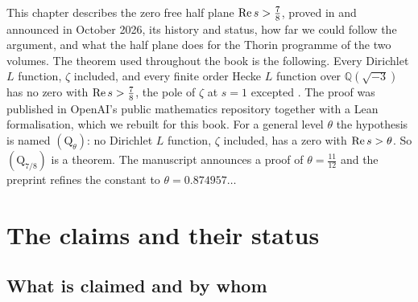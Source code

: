 
This chapter describes the zero free half plane $\operatorname{Re} s>\frac78$, proved in \cite{OAI26a} and announced in October 2026, its history and status, how far we could follow the argument, and what the half plane does for the Thorin programme of the two volumes. The theorem used throughout the book is the following. Every Dirichlet $L$ function, $\zeta$ included, and every finite order Hecke $L$ function over $\mathbb Q(\sqrt{-3})$ has no zero with $\operatorname{Re} s>\frac78$, the pole of $\zeta$ at $s=1$ excepted \cite{OAI26a}. The proof was published in OpenAI's public mathematics repository together with a Lean formalisation, which we rebuilt for this book. For a general level $\theta$ the hypothesis is named $(\mathrm Q_\theta)$: no Dirichlet $L$ function, $\zeta$ included, has a zero with $\operatorname{Re} s>\theta$. So $(\mathrm Q_{7/8})$ is a theorem. The manuscript \cite{OAI26b} announces a proof of $\theta=\frac{11}{12}$ and the preprint \cite{Liu26a} refines the constant to $\theta=0.874957\ldots$

\section{The claims and their status}\label{qrh:sec:claims}

\subsection{What is claimed and by whom}

